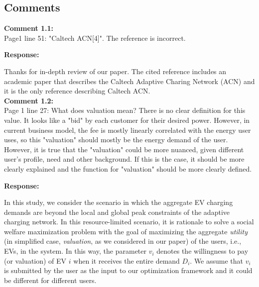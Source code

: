 \documentclass[11pt]{article}
\begin{document}
\subsection{Comments}

\vspace{5mm}
{
{\color{blue}\noindent\textbf{Comment 1.1:}\\
Page1 line 51: "Caltech ACN[4]". The reference is incorrect.
}}

\vspace{5mm}
\noindent\textbf{Response:}

Thanks for in-depth review of our paper. The cited reference includes an academic paper that describes the Caltech Adaptive Charing Network (ACN) and it is the only reference describing Caltech ACN.  
\\

\vspace{5mm}
{
{\color{blue}\noindent\textbf{Comment 1.2:}\\
Page 1 line 27: What does valuation mean? There is no clear definition for this value. It looks like a "bid" by each customer for their desired power. However, in current business model, the fee is mostly linearly correlated with the energy user uses, so this "valuation" should mostly be the energy demand of the user. However, it is true that the "valuation" could be more nuanced, given different user's profile, need and other background. If this is the case, it should be more clearly explained and the function for "valuation" should be more clearly defined.
}}

\vspace{5mm}
\noindent\textbf{Response:}

In this study, we consider the scenario in which the aggregate EV charging demands are beyond the local and global peak constraints of the adaptive charging network.  In this resource-limited scenario, it is rationale to solve a social welfare maximization problem with the goal of maximizing the aggregate \textit{utility} (in simplified case, \textit{valuation}, as we considered in our paper) of the users, i.e., EVs, in the system. In this way, the parameter $v_i$ denotes the willingness to pay (or valuation) of EV $i$ when it receives the entire demand $D_i$. We assume that $v_i$ is submitted by the user as the input to our optimization framework and it could be different for different users. 
\end{document}
